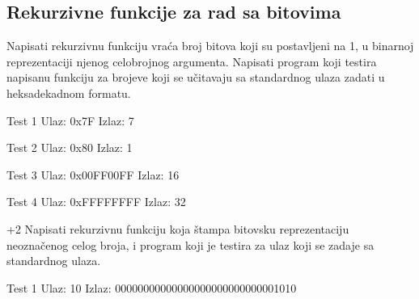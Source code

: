\subsection{Rekurzivne funkcije za rad sa bitovima}
\begin{Exercise}[label=103]
Napisati rekurzivnu funkciju vraća broj bitova koji su postavljeni na 1, u binarnoj reprezentaciji njenog celobrojnog argumenta.  Napisati program koji testira napisanu funkciju za brojeve koji se učitavaju sa standardnog ulaza zadati u heksadekadnom formatu. 


\begin{minitest}
\begin{test}{Test 1}
Ulaz:  0x7F    
Izlaz:  7             
\end{test}
\end{minitest}
\begin{minitest}
\begin{test}{Test 2}
Ulaz:  0x80
Izlaz:  1         
\end{test}
\end{minitest}
\begin{minitest}
\begin{test}{Test 3}
Ulaz:   0x00FF00FF
Izlaz:  16
\end{test}
\begin{test}{Test 4}
Ulaz:   0xFFFFFFFF       
Izlaz:  32
\end{test}
\end{minitest}  

\end{Exercise}
\begin{Answer}[ref=103]
\end{Answer}

\begin{Exercise}[label=115]\marker+{2}
Napisati rekurzivnu funkciju koja štampa bitovsku
  reprezentaciju neoznačenog celog broja, i program koji je
  testira za ulaz koji se zadaje sa standardnog ulaza.

\begin{maxitest}
\begin{test}{Test 1}
Ulaz:       10                                 
Izlaz:      00000000000000000000000000001010                    
\end{test}
\end{maxitest}
\end{Exercise}

